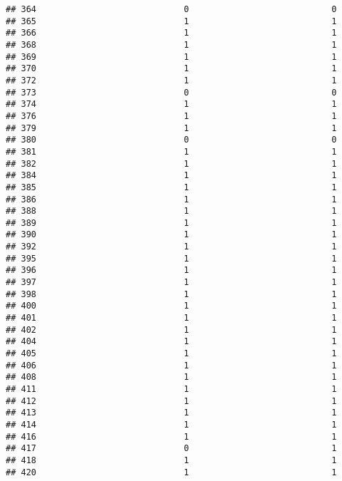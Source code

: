 \documentclass[
]{article}
\begin{document}
\begin{verbatim}
## 364                             0                            0
## 365                             1                            1
## 366                             1                            1
## 368                             1                            1
## 369                             1                            1
## 370                             1                            1
## 372                             1                            1
## 373                             0                            0
## 374                             1                            1
## 376                             1                            1
## 379                             1                            1
## 380                             0                            0
## 381                             1                            1
## 382                             1                            1
## 384                             1                            1
## 385                             1                            1
## 386                             1                            1
## 388                             1                            1
## 389                             1                            1
## 390                             1                            1
## 392                             1                            1
## 395                             1                            1
## 396                             1                            1
## 397                             1                            1
## 398                             1                            1
## 400                             1                            1
## 401                             1                            1
## 402                             1                            1
## 404                             1                            1
## 405                             1                            1
## 406                             1                            1
## 408                             1                            1
## 411                             1                            1
## 412                             1                            1
## 413                             1                            1
## 414                             1                            1
## 416                             1                            1
## 417                             0                            1
## 418                             1                            1
## 420                             1                            1

\end{verbatim}
\end{document}
